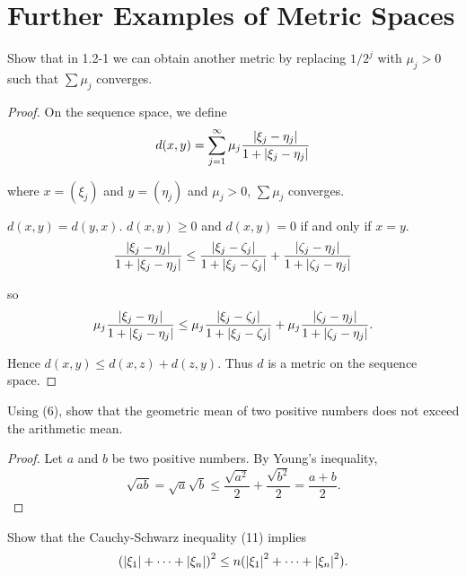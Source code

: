 \section{Further Examples of Metric Spaces}

\begin{exercise}\label{chapter1:section2:exercise1}
    Show that in 1.2-1 we can obtain another metric by replacing $1/2^{j}$ with $\mu_{j} > 0$ such that $\sum \mu_{j}$ converges.
\end{exercise}

\begin{proof}
    On the sequence space, we define
    \[
        d(x, y) = \sum^{\infty}_{j=1} \mu_{j}\frac{\left\vert{\xi_{j} - \eta_{j}}\right\vert}{1 + \left\vert{\xi_{j} - \eta_{j}}\right\vert}
    \]

    where $x = (\xi_{j})$ and $y = (\eta_{j})$ and $\mu_{j} > 0$, $\sum \mu_{j}$ converges.

    $d(x, y) = d(y, x)$. $d(x, y)\geq 0$ and $d(x, y) = 0$ if and only if $x = y$.
    \[
        \frac{\left\vert{\xi_{j} - \eta_{j}}\right\vert}{1 + \left\vert{\xi_{j} - \eta_{j}}\right\vert} \leq \frac{\left\vert{\xi_{j} - \zeta_{j}}\right\vert}{1 + \left\vert{\xi_{j} - \zeta_{j}}\right\vert} + \frac{\left\vert{\zeta_{j} - \eta_{j}}\right\vert}{1 + \left\vert{\zeta_{j} - \eta_{j}}\right\vert}
    \]

    so
    \[
        \mu_{j}\frac{\left\vert{\xi_{j} - \eta_{j}}\right\vert}{1 + \left\vert{\xi_{j} - \eta_{j}}\right\vert} \leq \mu_{j}\frac{\left\vert{\xi_{j} - \zeta_{j}}\right\vert}{1 + \left\vert{\xi_{j} - \zeta_{j}}\right\vert} + \mu_{j}\frac{\left\vert{\zeta_{j} - \eta_{j}}\right\vert}{1 + \left\vert{\zeta_{j} - \eta_{j}}\right\vert}.
    \]

    Hence $d(x, y)\leq d(x, z) + d(z, y)$. Thus $d$ is a metric on the sequence space.
\end{proof}

\begin{exercise}\label{chapter1:section2:exercise2}
    Using (6), show that the geometric mean of two positive numbers does not exceed the arithmetic mean.
\end{exercise}

\begin{proof}
    Let $a$ and $b$ be two positive numbers. By Young's inequality,
    \[
        \sqrt{ab} = \sqrt{a}\sqrt{b} \leq \frac{\sqrt{a^{2}}}{2} + \frac{\sqrt{b^{2}}}{2} = \frac{a + b}{2}.
    \]
\end{proof}

\begin{exercise}\label{chapter1:section2:exercise3}
    Show that the Cauchy-Schwarz inequality (11) implies
    \[
        {(\left\vert{\xi_{1}}\right\vert + \cdots + \left\vert{\xi_{n}}\right\vert)}^{2} \leq n(\left\vert{\xi_{1}}\right\vert^{2} + \cdots + \left\vert{\xi_{n}}\right\vert^{2}).
    \]
\end{exercise}

